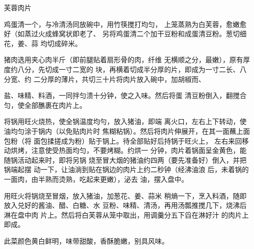 \begin{recipe}{芙蓉肉片}

\ingredients



\cooking

\step 鸡蛋清一个，与冷清汤同放碗中，用竹筷搅打均匀， 上笼蒸熟为白芙蓉，愈嫩愈好（如蒸过火成蜂窝状即老了、 另将鸡蛋清二个加干豆粉和成蛋清豆粉。葱切细花，姜、蒜 均切成碎米。

\step 猪肉选用夹心肉半斤（即前腿贴着扇形骨的肉，纤维 无横顺之分，最嫩），原有厚度约八分，先切成一寸二宽的 块，再横着切成半分厚的片，即成为一寸二长、八分宽、约 二分厚的薄片，共切三十片将肉片放入碗中，加胡椒而、

盐、味精、料酒，一同拌匀溃十分钟，使之入味。然后将蛋 清豆粉倒入，翻搅合匀，使全部醮裹在肉片上。

\step 将锅用旺火烧热，使全锅温度均勻，放入猪油，即端 离火口，左右上下转动，使油均匀涂于锅内（以免贴肉片时 焦糊粘锅）。然后将肉片伸展开，在其一面蘸上面包粉（将 面包揉搓成为粉）贴于锅上。待全部贴好后持锅于旺火上， 左右来回移动烘烤，注意使受热面均匀，不要烤糊。约烘一 分钟，肉片着锅面呈金黄色，能随锅活动起来时，即将另锅 烧至冒大烟的猪油约四两（要先准备好）倒入，并把锅端起摆 动一下，让油淌到贴在锅边的肉片上约二秒钟（经沸油浪 后，未着锅的一面肉，由半熟而烫熟，吃起来更嫩），泌去 油，摆入盘中。

\step 用旺火将锅烧至冒烟，放入猪油，加葱花、姜、蒜米 稍熵一下，烹入料酒，随即放入兑好的酱油、醋、白糖、水 豆粉、味精、清汤，再用汤瓢推搅几下，烧沸后淋在盘中肉 片上。然后将白芙蓉从笼中取出，用调羹分五下舀在淋好汁 的肉片上即成。

\notes

此菜颜色黄白鲜明，味带甜酸，香酥脆嫩，别具风味。

\end{recipe}


